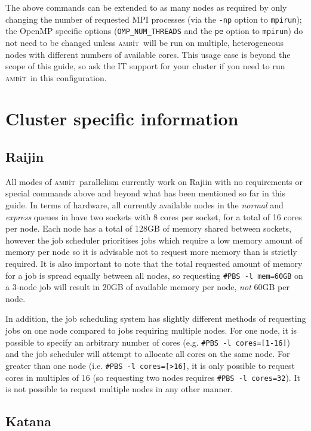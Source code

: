 \documentclass{report}
\newcommand{\ambit}{\textsc{amb}{\footnotesize i}\textsc{t}}
\begin{document}
The above commands can be extended to as many nodes as required by only changing the number of
requested MPI processes (via the \texttt{-np} option to \texttt{mpirun}); the OpenMP specific options
(\texttt{OMP\_NUM\_THREADS} and the \texttt{pe} option to \texttt{mpirun}) do not need to be changed
unless \ambit\ will be run on multiple, heterogeneous nodes with different numbers of available cores.
This usage case is beyond the scope of this guide, so ask the IT support for your cluster if you need to 
run \ambit\ in this configuration.

\section{Cluster specific information}
\label{sec:cluster_specific}
\subsection{Raijin}
All modes of \ambit\ parallelism currently work on Rajiin with no requirements or special commands above 
and beyond what has been mentioned so far in this guide. In terms of hardware, all currently available 
nodes in the \textit{normal} and \textit{express} queues in have two sockets with 8 cores per socket, 
for a total of 16 cores per node. Each node has a total of 128GB of memory shared between sockets,
however the job scheduler prioritises jobs which require a low memory amount of memory per node so it is 
advisable not to request more memory than is strictly required. It is also important to note that the
total requested amount of memory for a job is spread equally between all nodes, so requesting
\texttt{\#PBS -l mem=60GB} on a 3-node job will result in 20GB of available memory per node, \emph{not}
60GB per node.

In addition, the job scheduling system has slightly different methods of requesting jobs on one node 
compared to jobs requiring multiple nodes. For one node, it is possible to specify an arbitrary number of
cores (e.g. \texttt{\#PBS -l cores=[1-16]}) and the job scheduler will attempt to allocate all cores on 
the same node. For greater than one node (i.e. \texttt{\#PBS -l cores=[>16]}, it is only possible to 
request cores in multiples of 16 (so requesting two nodes requires \texttt{\#PBS -l cores=32}). It is 
not possible to request multiple nodes in any other manner.

\subsection{Katana}
\end{document}
